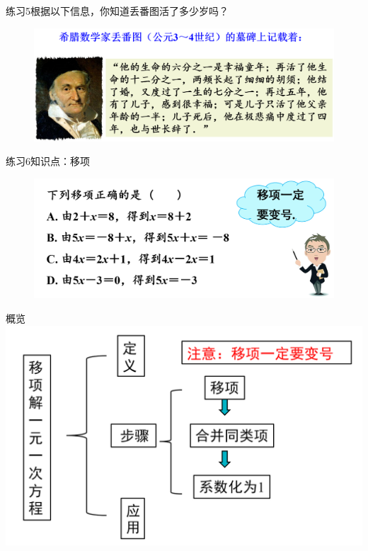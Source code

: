 \begin{frame}{练习5}{根据以下信息，你知道丢番图活了多少岁吗？}
    \begin{figure}
        \includegraphics[width=.9\textwidth]{assets/4.png}
    \end{figure}
\end{frame}

\begin{frame}{练习6}{知识点：移项}
    \begin{figure}
        \includegraphics[width=.8\textwidth]{assets/6.png}
    \end{figure} 
\end{frame}

\begin{frame}{概览}
    \includegraphics[width=.8\textwidth]{assets/10.png}
\end{frame}
